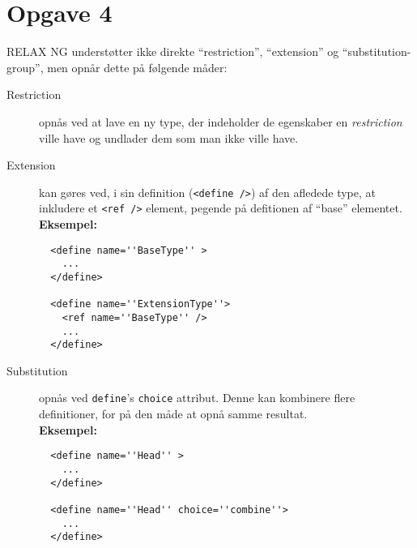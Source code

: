 \documentclass[a4paper,10pt]{article}
\begin{document}
\section*{Opgave 4}
RELAX NG understøtter ikke direkte ``restriction'', ``extension'' og ``substitution-group'', men opnår dette på følgende måder:
\begin{description}
\item[Restriction] opnås ved at lave en ny type, der indeholder de egenskaber en \textit{restriction} ville have og undlader dem som man ikke ville have.  
\item[Extension] kan gøres ved, i sin definition (\texttt{<define />}) af den afledede type, at inkludere et \texttt{<ref />} element, pegende på defitionen af ``base'' elementet. \\
{\bf Eksempel:}
\begin{lstlisting}
  <define name=''BaseType'' >
    ...
  </define>

  <define name=''ExtensionType''>
    <ref name=''BaseType'' />
    ...
  </define>
\end{lstlisting}
\item[Substitution] opnås ved \texttt{define}'s \texttt{choice} attribut. Denne kan kombinere flere definitioner, for på den måde at opnå samme resultat.  \\
{\bf Eksempel:}
\begin{lstlisting}
  <define name=''Head'' >
    ...
  </define>

  <define name=''Head'' choice=''combine''>
    ...
  </define>
\end{lstlisting}


\end{description}
\end{document}
